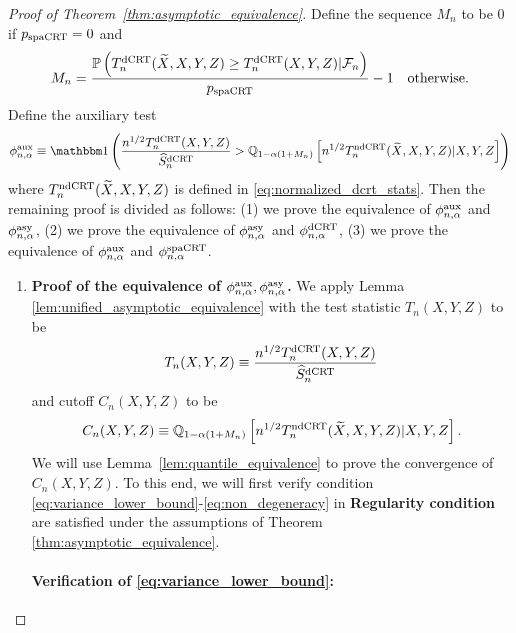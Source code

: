 \documentclass[12pt]{article}
\theoremstyle{definition}
\def\P{\mathbb{P}}
\def\P{\mathbb{P}}
\renewcommand{\P}{\mathbb{P}}							%
\newcommand{\Q}{\mathbb{Q}}								%
\newcommand{\indicator}{\mathbbm 1}						%
\newcommand{\srx}{X}									%
\newcommand{\srz}{Z}									%
\newcommand{\srxk}{\widetilde X}						%
\newcommand{\sry}{Y}									%
\newcommand{\dCRT}{\textnormal{dCRT}} 					%
\newcommand{\ndCRThat}{\textnormal{ndCRT}}	%
\newcommand{\spacrt}{\textnormal{spaCRT}}               %
\newcommand{\aux}{\textnormal{aux}}               %
\newcommand{\asy}{\textnormal{asy}}              %
\begin{document}
\begin{proof}[Proof of Theorem~\ref{thm:asymptotic_equivalence}]
	Define the sequence $M_n$ to be $0$ if $p_{\spacrt}=0$ and 
	\begin{align*}
		M_n = \frac{\P\left(T_n^{\dCRT}(\srxk,\srx,\sry,\srz)\geq T_n^{\dCRT}(\srx,\sry,\srz)|\mathcal{F}_n\right)}{p_{\spacrt}}-1\quad\text{otherwise}.
	\end{align*}
	Define the auxiliary test 
	\begin{align*}
		\phi^{\aux}_{n,\alpha}\equiv \indicator\left(\frac{n^{1/2}T_n^{\dCRT}(\srx,\sry,\srz)}{\widehat{S}_n^{\dCRT}}>\Q_{1-\alpha(1+M_n)}\left[n^{1/2}T_n^{\ndCRThat}(\widetilde{X},X,Y,Z)|X,Y,Z\right]\right)
	\end{align*}
	where $T_n^{\ndCRThat}(\srxk,\srx,\sry,\srz)$ is defined in \eqref{eq:normalized_dcrt_stats}. Then the remaining proof is divided as follows: (1) we prove the equivalence of $\phi_{n,\alpha}^{\aux}$ and $\phi_{n,\alpha}^{\asy}$, (2) we prove the equivalence of $\phi_{n,\alpha}^{\asy}$ and $\phi_{n,\alpha}^{\dCRT}$, (3) we prove the equivalence of $\phi_{n,\alpha}^{\aux}$ and $\phi_{n,\alpha}^{\spacrt}$.

\begin{enumerate}
	\item \textbf{Proof of the equivalence of $\phi_{n,\alpha}^{\aux},\phi_{n,\alpha}^{\asy}$.}
	We apply Lemma \ref{lem:unified_asymptotic_equivalence} with the test statistic $T_n(\srx,\sry,\srz)$ to be
	\begin{align*}
		T_n(\srx,\sry,\srz)\equiv\frac{n^{1/2}T_n^{\dCRT}(\srx,\sry,\srz)}{\widehat{S}_n^{\dCRT}}
	\end{align*}
	and cutoff $C_n(\srx,\sry,\srz)$ to be 
	\begin{align*}
		C_n(\srx,\sry,\srz)\equiv\Q_{1-\alpha(1+M_n)}\left[n^{1/2}T_n^{\ndCRThat}(\srxk, \srx, \sry,\srz)|\srx,\sry,\srz\right].
	\end{align*}
	We will use Lemma~\ref{lem:quantile_equivalence} to prove the convergence of $C_n(\srx,\sry,\srz)$. To this end, we will first verify condition \eqref{eq:variance_lower_bound}-\eqref{eq:non_degeneracy} in \textbf{Regularity condition} are satisfied under the assumptions of Theorem \ref{thm:asymptotic_equivalence}.
	
	\paragraph{Verification of \eqref{eq:variance_lower_bound}:}
	

\end{enumerate}
\end{proof}
\end{document}
